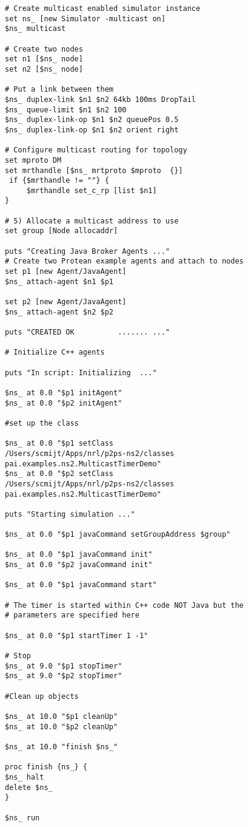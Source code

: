 \footnotesize
\begin{verbatim}
# Create multicast enabled simulator instance
set ns_ [new Simulator -multicast on]
$ns_ multicast

# Create two nodes
set n1 [$ns_ node]
set n2 [$ns_ node]

# Put a link between them
$ns_ duplex-link $n1 $n2 64kb 100ms DropTail
$ns_ queue-limit $n1 $n2 100
$ns_ duplex-link-op $n1 $n2 queuePos 0.5
$ns_ duplex-link-op $n1 $n2 orient right

# Configure multicast routing for topology
set mproto DM
set mrthandle [$ns_ mrtproto $mproto  {}]
 if {$mrthandle != ""} {
     $mrthandle set_c_rp [list $n1]
}

# 5) Allocate a multicast address to use
set group [Node allocaddr]
   
puts "Creating Java Broker Agents ..."   
# Create two Protean example agents and attach to nodes
set p1 [new Agent/JavaAgent]
$ns_ attach-agent $n1 $p1

set p2 [new Agent/JavaAgent]
$ns_ attach-agent $n2 $p2

puts "CREATED OK          ....... ..." 
    
# Initialize C++ agents

puts "In script: Initializing  ..." 
	
$ns_ at 0.0 "$p1 initAgent"
$ns_ at 0.0 "$p2 initAgent"

#set up the class

$ns_ at 0.0 "$p1 setClass 
/Users/scmijt/Apps/nrl/p2ps-ns2/classes pai.examples.ns2.MulticastTimerDemo"
$ns_ at 0.0 "$p2 setClass 
/Users/scmijt/Apps/nrl/p2ps-ns2/classes pai.examples.ns2.MulticastTimerDemo"

puts "Starting simulation ..." 

$ns_ at 0.0 "$p1 javaCommand setGroupAddress $group"

$ns_ at 0.0 "$p1 javaCommand init"
$ns_ at 0.0 "$p2 javaCommand init"

$ns_ at 0.0 "$p1 javaCommand start"

# The timer is started within C++ code NOT Java but the
# parameters are specified here

$ns_ at 0.0 "$p1 startTimer 1 -1"

# Stop
$ns_ at 9.0 "$p1 stopTimer"
$ns_ at 9.0 "$p2 stopTimer"

#Clean up objects 

$ns_ at 10.0 "$p1 cleanUp"
$ns_ at 10.0 "$p2 cleanUp"

$ns_ at 10.0 "finish $ns_"

proc finish {ns_} {
$ns_ halt
delete $ns_
}

$ns_ run
\end{verbatim}
\normalsize

